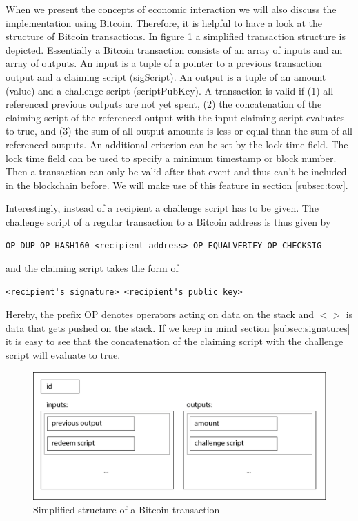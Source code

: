 \documentclass[10pt, conference,compsoc]{IEEEtran}
\begin{document}
   When we present the concepts of economic interaction we will also discuss the implementation using Bitcoin. Therefore, it is helpful to have a look at the structure of Bitcoin transactions. In figure \ref{fig:tx} a simplified transaction structure is depicted. Essentially a Bitcoin transaction consists of an array of inputs and an array of outputs. An input is a tuple of a pointer to a previous transaction output and a claiming script (sigScript). An output is a tuple of an amount (value) and a challenge script (scriptPubKey). A transaction is valid if (1) all referenced previous outputs are not yet spent, (2) the concatenation of the claiming script of the referenced output with the input claiming script evaluates to true, and (3) the sum of all output amounts is less or equal than the sum of all referenced outputs. An additional criterion can be set by the lock time field. The lock time field can be used to specify a minimum timestamp or block number. Then a transaction can only be valid after that event and thus can't be included in the blockchain before. We will make use of this feature in section \ref{subsec:tow}.

   Interestingly, instead of a recipient a challenge script has to be given. The challenge script of a regular transaction to a Bitcoin address is thus given by

    \begin{lstlisting}[breaklines=true]
      OP_DUP OP_HASH160 <recipient address> OP_EQUALVERIFY OP_CHECKSIG
    \end{lstlisting}

    and the claiming script takes the form of

    \begin{lstlisting}[breaklines=true]
      <recipient's signature> <recipient's public key>
    \end{lstlisting}
    Hereby, the prefix OP denotes operators acting on data on the stack and $< >$ is data that gets pushed on the stack.
    If we keep in mind section \ref{subsec:signatures} it is easy to see that the concatenation of the claiming script with the challenge script will evaluate to true. 

  \begin{figure}[!t]
    \centering
    \includegraphics[width=\linewidth]{BitcoinTransaction}
    \caption{Simplified structure of a Bitcoin transaction}
    \label{fig:tx}
  \end{figure}
\end{document}
